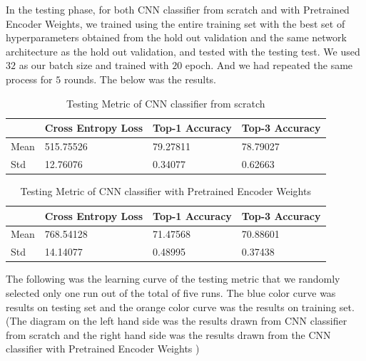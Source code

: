 \documentclass{article}
\begin{document}
In the testing phase, for both CNN classifier from scratch and with Pretrained Encoder Weights, we trained using the entire training set with the best set of hyperparameters obtained from the hold out validation and the same network architecture as the hold out validation, and tested with the testing test. We used $32$ as our batch size and trained with $20$ epoch. And we had repeated the same process for $5$ rounds. The below was the results.

\begin{table}[htb]
\caption{Testing Metric of CNN classifier from scratch}
	\label{sample-table}
	\centering
\begin{tabular}{llll}
\toprule
		\cmidrule{1-4}
		& Cross Entropy Loss & Top-1 Accuracy & Top-3 Accuracy 		\\
	\midrule
 	Mean & 515.75526 & 79.27811& 78.79027 \\
 	Std & 12.76076 & 0.34077 & 0.62663\\
\bottomrule
\end{tabular}
\end{table}

\pagebreak

\begin{table}[htb]
\caption{Testing Metric of CNN classifier with Pretrained Encoder Weights }
	\label{sample-table}
	\centering
\begin{tabular}{llll}
\toprule
		\cmidrule{1-4}
		& Cross Entropy Loss & Top-1 Accuracy & Top-3 Accuracy 		\\
	\midrule
 	Mean & 768.54128 & 71.47568 & 70.88601  \\
 	Std & 14.14077 & 0.48995 & 0.37438 \\
\bottomrule
\end{tabular}
\end{table}

The following was the learning curve of the testing metric that we randomly selected only one run out of the total of five runs. The blue color curve was results on testing set and the orange color curve was the results on training set. (The diagram on the left hand side was the results drawn from CNN classifier from scratch and the right hand side was the results drawn from the CNN classifier with Pretrained Encoder Weights )
\end{document}
